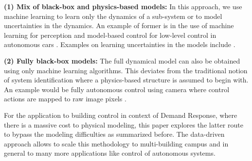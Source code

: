 \noindent \textbf{(1) Mix of black-box and physics-based models:} In this approach, we use machine learning to learn only the dynamics of a sub-system or to model uncertainties in the dynamics. An example of former is in the use of machine learning for perception and model-based control for low-level control in autonomous cars \cite{Urmson2008}. Examples on learning uncertainties in the models include \cite{Berkenkamp2015,Desaraju2016}.

\noindent \textbf{(2) Fully black-box models:} The full dynamical model can also be obtained using only machine learning algorithms. This deviates from the traditional notion of system identification where a physics-based structure is assumed to begin with. An example would be fully autonomous control using camera where control actions are mapped to raw image pixels \cite{Bojarski2016}. 

For the application to building control in context of Demand Response, where there is a massive cost to physical modeling, this paper explores the latter route to bypass the modeling difficulties as summarized before. The data-driven approach allows to scale this methodology to multi-building campus and in general to many more applications like control of autonomous systems.

